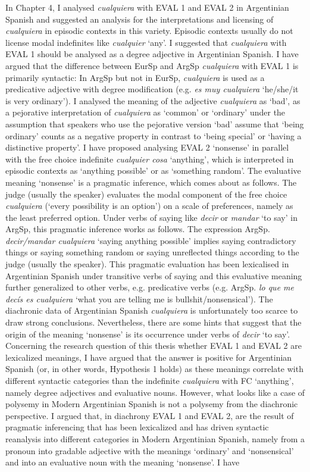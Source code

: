\documentclass[output=paper]{langscibook}
\begin{document}
  In Chapter 4, I analysed \textit{cualquiera} with EVAL 1 and EVAL 2 in Argentinian Spanish and suggested an analysis for the interpretations and licensing of \textit{cualquiera} in episodic contexts in this variety. Episodic contexts usually do not license modal indefinites like \textit{cualquier} ‘any’. I suggested that \textit{cualquiera} with EVAL 1 should be analysed as a degree adjective in Argentinian Spanish. I have argued that the difference between EurSp and ArgSp \textit{cualquiera} with EVAL 1 is primarily syntactic: In ArgSp but not in EurSp, \textit{cualquiera} is used as a predicative adjective with degree modification (e.g. \textit{es muy cualquiera} ‘he/she/it is very ordinary’). I analysed the meaning of the adjective \textit{cualquiera} as ‘bad’, as a pejorative interpretation of \textit{cualquiera} as ‘common’ or ‘ordinary’ under the assumption that speakers who use the pejorative version ‘bad’ assume that ‘being ordinary’ counts as a negative property in contrast to ‘being special’ or ‘having a distinctive property’. I have proposed analysing EVAL 2 ‘nonsense’ in parallel with the free choice indefinite \textit{cualquier cosa} ‘anything’, which is interpreted in episodic contexts as ‘anything possible’ or as ‘something random’. The evaluative meaning ‘nonsense’ is a pragmatic inference, which comes about as follows. The judge (usually the speaker) evaluates the modal component of the free choice \textit{cualquiera} (‘every possibility is an option’) on a scale of preferences, namely as the least preferred option. Under verbs of saying like \textit{decir} or \textit{mandar} ‘to say’ in ArgSp, this pragmatic inference works as follows. The expression ArgSp. \textit{decir/mandar cualquiera} ‘saying anything possible’ implies saying contradictory things or saying something random or saying unreflected things according to the judge (usually the speaker). This pragmatic evaluation has been lexicalised in Argentinian Spanish under transitive verbs of saying and this evaluative meaning further generalized to other verbs, e.g. predicative verbs (e.g. ArgSp. \textit{lo que me decís es cualquiera} ‘what you are telling me is bullshit/nonsensical’). The diachronic data of Argentinian Spanish \textit{cualquiera} is unfortunately too scarce to draw strong conclusions. Nevertheless, there are some hints that suggest that the origin of the meaning ‘nonsense’ is its occurrence under verbs of \textit{decir} ‘to say’. Concerning the research question of this thesis whether EVAL 1 and EVAL 2 are lexicalized meanings, I have argued that the answer is positive for Argentinian Spanish (or, in other words, Hypothesis 1 holds) as these meanings correlate with different syntactic categories than the indefinite \textit{cualquiera} with FC ‘anything’, namely degree adjectives and evaluative nouns. However, what looks like a case of polysemy in Modern Argentinian Spanish is not a polysemy from the diachronic perspective. I argued that, in diachrony EVAL 1 and EVAL 2, are the result of pragmatic inferencing that has been lexicalized and has driven syntactic reanalysis into different categories in Modern Argentinian Spanish, namely from a pronoun into gradable adjective with the meanings ‘ordinary’ and ‘nonsensical’ and into an evaluative noun with the meaning ‘nonsense’. I have 
\end{document}
